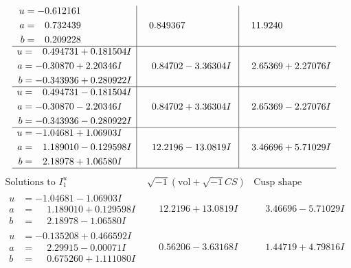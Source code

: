 \documentclass[1p]{elsarticle_modified}
\theoremstyle{definition}
\newcommand{\I}{\sqrt{-1}}
\begin{document}
$$\begin{array}{c|c|c}
\begin{aligned}
u &= -0.612161\phantom{ +0.000000I} \\
a &= \phantom{-}0.732439\phantom{ +0.000000I} \\
b &= \phantom{-}0.209228\phantom{ +0.000000I}\end{aligned}
 & \phantom{-}0.849367\phantom{ +0.000000I} & \phantom{-}11.9240\phantom{ +0.000000I} \\ \hline\begin{aligned}
u &= \phantom{-}0.494731 + 0.181504 I \\
a &= -0.30870 + 2.20346 I \\
b &= -0.343936 + 0.280922 I\end{aligned}
 & \phantom{-}0.84702 - 3.36304 I & \phantom{-}2.65369 + 2.27076 I \\ \hline\begin{aligned}
u &= \phantom{-}0.494731 - 0.181504 I \\
a &= -0.30870 - 2.20346 I \\
b &= -0.343936 - 0.280922 I\end{aligned}
 & \phantom{-}0.84702 + 3.36304 I & \phantom{-}2.65369 - 2.27076 I \\ \hline\begin{aligned}
u &= -1.04681 + 1.06903 I \\
a &= \phantom{-}1.189010 - 0.129598 I \\
b &= \phantom{-}2.18978 + 1.06580 I\end{aligned}
 & \phantom{-}12.2196 - 13.0819 I & \phantom{-}3.46696 + 5.71029 I\\
 \hline 
 \end{array}$$\newpage$$\begin{array}{c|c|c}  
\text{Solutions to }I^u_{1}& \I (\text{vol} + \sqrt{-1}CS) & \text{Cusp shape}\\
 \hline 
\begin{aligned}
u &= -1.04681 - 1.06903 I \\
a &= \phantom{-}1.189010 + 0.129598 I \\
b &= \phantom{-}2.18978 - 1.06580 I\end{aligned}
 & \phantom{-}12.2196 + 13.0819 I & \phantom{-}3.46696 - 5.71029 I \\ \hline\begin{aligned}
u &= -0.135208 + 0.466592 I \\
a &= \phantom{-}2.29915 - 0.00071 I \\
b &= \phantom{-}0.675260 + 1.111080 I\end{aligned}
 & \phantom{-}0.56206 - 3.63168 I & \phantom{-}1.44719 + 4.79816 I \\ \hline\begin{aligned}

\end{aligned}
\end{array}$$
\end{document}
